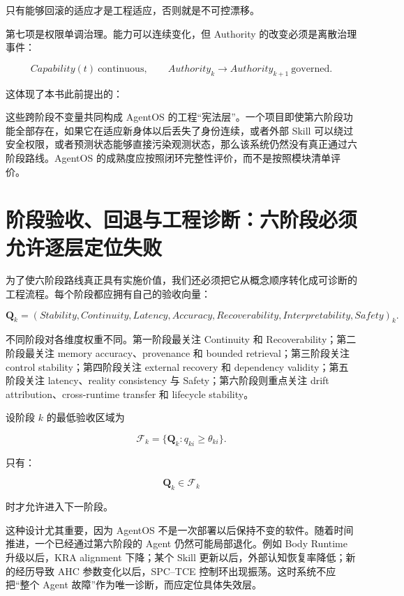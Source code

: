 只有能够回滚的适应才是工程适应，否则就是不可控漂移。

第七项是权限单调治理。能力可以连续变化，但 Authority 的改变必须是离散治理事件：

\[
Capability(t)
\ \mathrm{continuous},
\qquad
Authority_k
\rightarrow
Authority_{k+1}
\ \mathrm{governed}.
\]

这体现了本书此前提出的：

\begin{statementbox}
\centering
{}
\end{statementbox}

这些跨阶段不变量共同构成 AgentOS 的工程“宪法层”。一个项目即使第六阶段功能全部存在，如果它在适应新身体以后丢失了身份连续，或者外部 Skill 可以绕过安全权限，或者预测状态能够直接污染观测状态，那么该系统仍然没有真正通过六阶段路线。AgentOS 的成熟度应按照闭环完整性评价，而不是按照模块清单评价。

\section{阶段验收、回退与工程诊断：六阶段必须允许逐层定位失败}

为了使六阶段路线真正具有实施价值，我们还必须把它从概念顺序转化成可诊断的工程流程。每个阶段都应拥有自己的验收向量：

\[
\mathbf Q_k
=
(
Stability,
Continuity,
Latency,
Accuracy,
Recoverability,
Interpretability,
Safety
)_k.
\]

不同阶段对各维度权重不同。第一阶段最关注 Continuity 和 Recoverability；第二阶段最关注 memory accuracy、provenance 和 bounded retrieval；第三阶段关注 control stability；第四阶段关注 external recovery 和 dependency validity；第五阶段关注 latency、reality consistency 与 Safety；第六阶段则重点关注 drift attribution、cross-runtime transfer 和 lifecycle stability。

设阶段 \(k\) 的最低验收区域为

\[
\mathcal F_k
=
\{
\mathbf Q_k:
q_{ki}\geq\theta_{ki}
\}.
\]

只有：

\[
\mathbf Q_k\in\mathcal F_k
\]

时才允许进入下一阶段。

这种设计尤其重要，因为 AgentOS 不是一次部署以后保持不变的软件。随着时间推进，一个已经通过第六阶段的 Agent 仍然可能局部退化。例如 Body Runtime 升级以后，KRA alignment 下降；某个 Skill 更新以后，外部认知恢复率降低；新的经历导致 AHC 参数变化以后，SPC--TCE 控制环出现振荡。这时系统不应把“整个 Agent 故障”作为唯一诊断，而应定位具体失效层。

